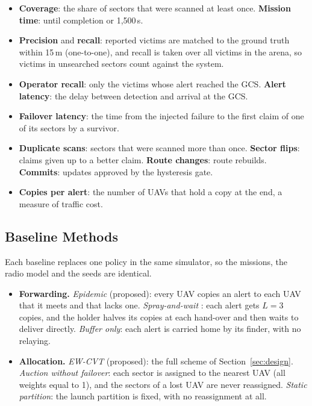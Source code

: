 \documentclass[10pt,letterpaper]{article}
\begin{document}
\begin{itemize}
\item \textbf{Coverage}: the share of sectors that were scanned at least once. \textbf{Mission time}: until completion or 1,500\,s.
\item \textbf{Precision} and \textbf{recall}: reported victims are matched to the ground truth within 15\,m (one-to-one), and recall is taken over all victims in the arena, so victims in unsearched sectors count against the system.
\item \textbf{Operator recall}: only the victims whose alert reached the GCS. \textbf{Alert latency}: the delay between detection and arrival at the GCS.
\item \textbf{Failover latency}: the time from the injected failure to the first claim of one of its sectors by a survivor.
\item \textbf{Duplicate scans}: sectors that were scanned more than once. \textbf{Sector flips}: claims given up to a better claim. \textbf{Route changes}: route rebuilds. \textbf{Commits}: updates approved by the hysteresis gate.
\item \textbf{Copies per alert}: the number of UAVs that hold a copy at the end, a measure of traffic cost.
\end{itemize}

\subsection{Baseline Methods}
Each baseline replaces one policy in the same simulator, so the missions, the radio model and the seeds are identical.
\begin{itemize}
\item \textbf{Forwarding.} \emph{Epidemic} (proposed): every UAV copies an alert to each UAV that it meets and that lacks one. \emph{Spray-and-wait} \cite{spyropoulos2005spray}: each alert gets $L=3$ copies, and the holder halves its copies at each hand-over and then waits to deliver directly. \emph{Buffer only}: each alert is carried home by its finder, with no relaying.
\item \textbf{Allocation.} \emph{EW-CVT} (proposed): the full scheme of Section~\ref{sec:design}. \emph{Auction without failover}: each sector is assigned to the nearest UAV (all weights equal to 1), and the sectors of a lost UAV are never reassigned. \emph{Static partition}: the launch partition is fixed, with no reassignment at all.
\end{itemize}
\end{document}
